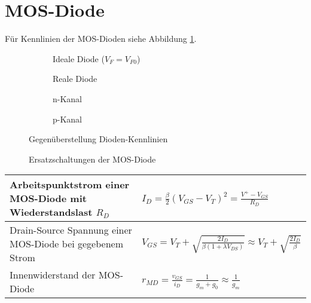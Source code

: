 \section{MOS-Diode}
Für Kennlinien der MOS-Dioden siehe Abbildung \ref{fig:diodenKennlinien}.
\begin{figure}[h]
	\centering
	\begin{subfigure}[b]{5cm}
		\centering
		\caption{Ideale Diode ($V_F = V_{F0}$)}
	\end{subfigure}
	\begin{subfigure}[b]{4cm}
		\centering
		\caption{Reale Diode}
	\end{subfigure} \quad
	\begin{subfigure}[b]{4cm}
		\centering
		\caption{n-Kanal}
	\end{subfigure}
	\begin{subfigure}[b]{4cm}
		\centering
		\caption{p-Kanal}
	\end{subfigure}
	\hspace{1.5cm}
	
	\begin{subfigure}[b]{4cm}
	\end{subfigure} \quad
	\begin{subfigure}[b]{4cm}
		\centering
	\end{subfigure} \qquad
	\begin{subfigure}[b]{8cm}
		\centering
	\end{subfigure}			
	\caption{Gegenüberstellung Dioden-Kennlinien}
	\label{fig:diodenKennlinien}
\end{figure}

\begin{figure}[h]
	\centering
	\begin{subfigure}[b]{5cm}
		\centering
		{}
	\end{subfigure} \qquad\qquad
	\begin{subfigure}[b]{3cm}
		\centering
		{}
	\end{subfigure}
	\caption{Ersatzschaltungen der MOS-Diode}
\end{figure}

\begin{tabular}{|l|l|}
	\hline
	Arbeitspunktstrom einer MOS-Diode mit Wiederstandslast $R_D$
	& $I_D = \frac{\beta}{2} (V_{GS} -V_T)^2 = \frac{V^+ - V_{GS}}{R_D} $
	\\ \hline
	Drain-Source Spannung einer MOS-Diode bei gegebenem Strom
	& $ V_{GS} = V_T + \sqrt{\frac{2I_D}{\beta(1+\lambda V_{DS})}} \approx V_T + \sqrt{\frac{2I_D}{\beta}} $
	\\ \hline
	Innenwiderstand der MOS-Diode
	& $ r_{MD} = \frac{v_{GS}}{i_D} = \frac{1}{g_m + g_0} \approx \frac{1}{g_m} $
	\\ \hline	
\end{tabular}

